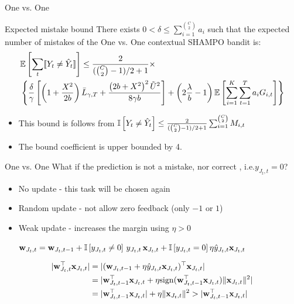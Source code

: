 \documentclass{beamer}
\begin{document}
\begin{frame}{One vs. One}
\begin{block}{Expected mistake bound}
There exists $0<\delta\le \sum_{i=1}^{C \choose 2}a_{i}$ such that the  expected number of mistakes  of the One vs. One contextual SHAMPO bandit  is:
 \[
 \begin{split}
 &\mathbb{E}\left[{\sum_t [\![{Y_t \neq \hat{Y}_t}]\!]}\right]\le \frac{2}{({C \choose 2}-1)/2+1}\times\\
 &\left\{{ \frac{\delta}{\gamma}\left[{\left({1+\frac{X^2}{2b} }\right){\bar L}_{\gamma,T}+\frac{\left({{2b+X^2}}\right)^2\tilde{U}^{2}}{8{\gamma}b}}\right]+\left({2\frac{\lambda}{b}-1}\right)\mathbb{E}\left[{\sum_{i=1}^{K}\sum_{t=1}^{T}{a_{i}G_{i,t}}}\right]}\right\}
 \end{split}
 \]
\end{block}
\begin{itemize}

\item This bound is follows from $\mathbb{I}\left[{Y_t \neq \hat{Y}_t}\right] \leq \frac{2}{({C \choose 2}-1)/2+1}\sum_{i=1}^{ {C \choose 2}} M_{i,t}$\newline [Allwein et al., 2000]\newline
\item The bound coefficient is upper bounded by 4.
\end{itemize}
\end{frame}

\begin{frame}{One vs. One}
What if the prediction is not a mistake, nor correct , i.e.$y_{J_t,t}=0$?\newline
\begin{itemize}
\item No update -  this task will be chosen again\newline
\item Random update - not allow zero feedback (only $-1$ or $1$)\newline
\item Weak update - increases the margin using $\eta>0$\newline

$
\mathbf{w}_{J_t,t} = \mathbf{w}_{J_t,t-1}+ \mathbb{I}\left[{y_{J_t,t}\ne0}\right] \, y_{J_t,t}\, \mathbf{x}_{J_t,t} +
 \mathbb{I}\left[{y_{J_t,t}=0}\right] \eta \hat{y}_{J_t,t}\mathbf{x}_{J_t,t}~$
\newline
\end{itemize}
\begin{equation*}
\begin {aligned}
\vert {\mathbf{w}}^{\top}_{J_t,t} \mathbf{x}_{J_t,t} \vert &= \vert
(\mathbf{w}_{J_t,t-1}+ \eta \hat{y}_{J_t,t}\mathbf{x}_{J_t,t})^\top\mathbf{x}_{J_t,t}\vert \\
&= \vert {\mathbf{w}}^{\top}_{J_t,t-1}\mathbf{x}_{J_t,t}+ \eta {\rm sign}({\mathbf{w}}^{\top}_{J_t,t-1}\mathbf{x}_{J_t,t}) \Vert\mathbf{x}_{J_t,t}\Vert^2 \vert \\
&= \vert {\mathbf{w}}^{\top}_{J_t,t-1}\mathbf{x}_{J_t,t}\vert + \eta \Vert\mathbf{x}_{J_t,t}\Vert^2 > \vert {\mathbf{w}}^{\top}_{J_t,t-1}\mathbf{x}_{J_t,t}\vert
\end{aligned}
\end{equation*}
\end{frame}
\end{document}
